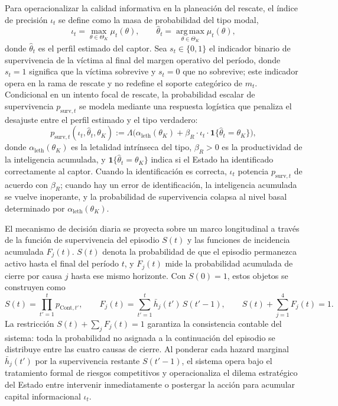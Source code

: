 \documentclass[pdflatex,sn-mathphys-ay]{sn-jnl}
\theoremstyle{thmstyleone}
\theoremstyle{thmstyletwo}
\theoremstyle{thmstylethree}
\newcommand{\ThetaK}{\Theta_K}
\newcommand{\1}{\mathbf{1}}
\begin{document}
Para operacionalizar la calidad informativa en la planeación del rescate, el índice de precisión $\iota_t$ se define como la masa de probabilidad del tipo modal,
\begin{equation}
\iota_t=\max_{\theta\in\ThetaK}\mu_t(\theta),\qquad\hat{\theta}_t=\operatorname*{arg\,max}_{\theta\in\ThetaK}\mu_t(\theta),
\label{eq:iota}
\end{equation}
donde $\hat{\theta}_t$ es el perfil estimado del captor. Sea $s_t\in\{0,1\}$ el indicador binario de supervivencia de la víctima al final del margen operativo del período, donde $s_t=1$ significa que la víctima sobrevive y $s_t=0$ que no sobrevive; este indicador opera en la rama de rescate y no redefine el soporte categórico de $m_t$. Condicional en un intento focal de rescate, la probabilidad escalar de supervivencia $p_{\mathrm{surv},t}$ se modela mediante una respuesta logística que penaliza el desajuste entre el perfil estimado y el tipo verdadero:
\begin{equation}
p_{\mathrm{surv},t}(\iota_t,\hat{\theta}_t,\theta_K):=\Lambda\bigl(\alpha_{\mathrm{leth}}(\theta_K)+\beta_R\cdot\iota_t\cdot\mathbf{1}\{\hat{\theta}_t=\theta_K\}\bigr),
\label{eq:p-surv}
\end{equation}
donde $\alpha_{\mathrm{leth}}(\theta_K)$ es la letalidad intrínseca del tipo, $\beta_R>0$ es la productividad de la inteligencia acumulada, y $\mathbf{1}\{\hat{\theta}_t=\theta_K\}$ indica si el Estado ha identificado correctamente al captor. Cuando la identificación es correcta, $\iota_t$ potencia $p_{\mathrm{surv},t}$ de acuerdo con $\beta_R$; cuando hay un error de identificación, la inteligencia acumulada se vuelve inoperante, y la probabilidad de supervivencia colapsa al nivel basal determinado por $\alpha_{\mathrm{leth}}(\theta_K)$.

El mecanismo de decisión diaria se proyecta sobre un marco longitudinal a través de la función de supervivencia del episodio $S(t)$ y las funciones de incidencia acumulada $F_j(t)$. $S(t)$ denota la probabilidad de que el episodio permanezca activo hasta el final del período $t$, y $F_j(t)$ mide la probabilidad acumulada de cierre por causa $j$ hasta ese mismo horizonte. Con $S(0)=1$, estos objetos se construyen como
\begin{equation}
S(t)=\prod_{t'=1}^{t}p_{\mathrm{Cont},t'},\qquad F_j(t)=\sum_{t'=1}^{t}\bar h_j(t')\,S(t'-1),\qquad S(t)+\sum_{j=1}^{4}F_j(t)=1.
\label{eq:longitudinal}
\end{equation}
La restricción $S(t)+\sum_j F_j(t)=1$ garantiza la consistencia contable del sistema: toda la probabilidad no asignada a la continuación del episodio se distribuye entre las cuatro causas de cierre. Al ponderar cada hazard marginal $\bar h_j(t')$ por la supervivencia restante $S(t'-1)$, el sistema opera bajo el tratamiento formal de riesgos competitivos y operacionaliza el dilema estratégico del Estado entre intervenir inmediatamente o postergar la acción para acumular capital informacional $\iota_t$.
\end{document}
